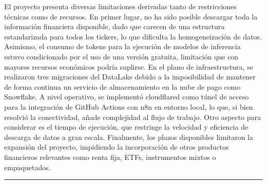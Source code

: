 \documentclass[letterpaper,10pt,spanish]{sphinxmanual}
\begin{document}
\sphinxAtStartPar
El proyecto presenta diversas limitaciones derivadas tanto de restricciones técnicas como de recursos. En primer lugar, no ha sido posible descargar toda la información financiera disponible, dado que carecen de una estructura estandarizada para todos los tickers, lo que dificulta la homogeneización de datos. Asimismo, el consumo de tokens para la ejecución de modelos de inferencia estuvo condicionado por el uso de una versión gratuita, limitación que con mayores recursos económicos podría suplirse. En el plano de infraestructura, se realizaron tres migraciones del DataLake debido a la imposibilidad de mantener de forma continua un servicio de almacenamiento en la nube de pago como Snowflake. A nivel operativo, se implementó cloudflared como túnel de acceso para la integración de GitHub Actions con n8n en entorno local, lo que, si bien resolvió la conectividad, añade complejidad al flujo de trabajo. Otro aspecto para considerar es el tiempo de ejecución, que restringe la velocidad y eficiencia de descarga de datos a gran escala. Finalmente, los plazos disponibles limitaron la expansión del proyecto, impidiendo la incorporación de otros productos financieros relevantes como renta fija, ETFs, instrumentos mixtos o empaquetados.


\bigskip\hrule\bigskip
\end{document}
